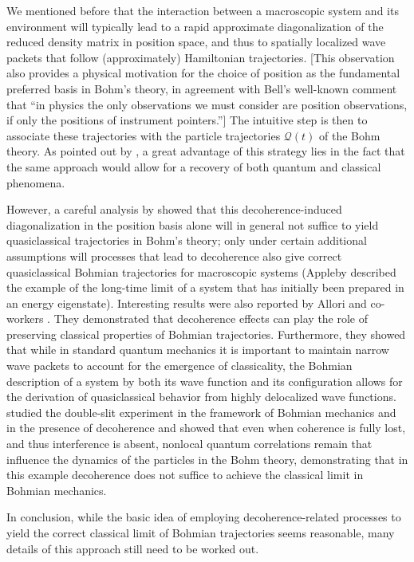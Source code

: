 \documentclass[twocolumn,rmp,aps,amsmath,amsfonts,noshowkeys,noshowpacs]{revtex4}
\begin{document}
We mentioned before that the interaction between a macroscopic system
and its environment will typically lead to a rapid approximate
diagonalization of the reduced density matrix in position space, and
thus to spatially localized wave packets that follow (approximately)
Hamiltonian trajectories. [This observation also provides a physical
motivation for the choice of position as the fundamental preferred
basis in Bohm's theory, in agreement with Bell's
\citeyearpar{Bell:1982:ag} well-known comment that ``in physics the
only observations we must consider are position observations, if only
the positions of instrument pointers.''] The intuitive step is then to
associate these trajectories with the particle trajectories
$\mathcal{Q}(t)$ of the Bohm theory. As pointed out by
\citet{Bacciagaluppi:2003:az}, a great advantage of this strategy lies
in the fact that the same approach would allow for a recovery of both
quantum and classical phenomena.

However, a careful analysis by \citet{Appleby:1999:zs} showed that
this decoherence-induced diagonalization in the position basis alone
will in general not suffice to yield quasiclassical trajectories in
Bohm's theory; only under certain additional assumptions will
processes that lead to decoherence also give correct quasiclassical
Bohmian trajectories for macroscopic systems (Appleby described the
example of the long-time limit of a system that has initially been
prepared in an energy eigenstate).  Interesting results were also
reported by Allori and co-workers
\citep{Allori:2001:po,Allori:2001:tc,Allori:2001:vl}. They
demonstrated that decoherence effects can play the role of
preserving classical properties of Bohmian trajectories. Furthermore,
they showed that while in standard quantum mechanics it is important
to maintain narrow wave packets to account for the emergence of
classicality, the Bohmian description of a system by both its wave
function and its configuration allows for the derivation of
quasiclassical behavior from highly delocalized wave functions.
\citet{Sanz:2003:za} studied the double-slit experiment in the
framework of Bohmian mechanics and in the presence of decoherence and
showed that even when coherence is fully lost, and thus interference is
absent, nonlocal quantum correlations remain that influence the
dynamics of the particles in the Bohm theory, demonstrating that in
this example decoherence does not suffice to achieve the classical
limit in Bohmian mechanics.

In conclusion, while the basic idea of employing decoherence-related
processes to yield the correct classical limit of Bohmian trajectories
seems reasonable, many details of this approach still need to be
worked out.
\end{document}
